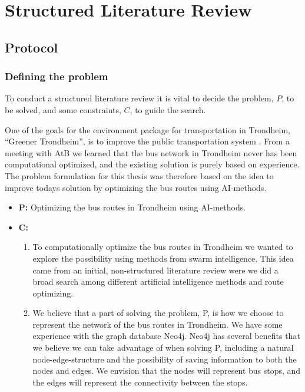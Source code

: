 \chapter{Structured Literature Review}

\label{appendixA}
\section{Protocol}

\subsection{Defining the problem}
\label{sec:researchQSLR}
To conduct a structured literature review it is vital to decide the problem, $P$, to be solved, and some constraints, $C$, to guide the search.

One of the goals for the environment package for transportation in Trondheim, ``Greener Trondheim'', is to improve the public transportation system \citep{website:miljopakken}. From a meeting with AtB\citep{website:atb} we learned that the bus network in Trondheim never has been computational optimized, and the existing solution is purely based on experience. The problem formulation for this thesis was therefore based on the idea to improve todays solution by optimizing the bus routes using AI-methods. 

\begin{itemize}
\item \textbf{P:} Optimizing the bus routes in Trondheim using AI-methods. %
\item \textbf{C:} 
    \begin{enumerate}
        \item To computationally optimize the bus routes in Trondheim we wanted to explore the possibility using methods from swarm intelligence. This idea came from an initial, non-structured literature review were we did a broad search among different artificial intelligence methods and route optimizing. %
        \item We believe that a part of solving the problem, P, is how we choose to represent the network of the bus routes in Trondheim. We have some experience with the graph database Neo4j. Neo4j has several benefits that we believe we can take advantage of when solving P, including a natural node-edge-structure and the possibility of saving information to both the nodes and edges. We envision that the nodes will represent bus stops, and the edges will represent the connectivity between the stops. 
    \end{enumerate}
\end{itemize}

